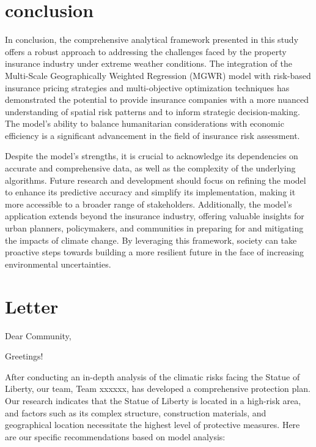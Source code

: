 \documentclass[12pt]{article}
\begin{document}
\section{conclusion}
 In conclusion, the comprehensive analytical framework presented in this study offers a robust approach to addressing the challenges faced by the property insurance industry under extreme weather conditions. The integration of the Multi-Scale Geographically Weighted Regression (MGWR) model with risk-based insurance pricing strategies and multi-objective optimization techniques has demonstrated the potential to provide insurance companies with a more nuanced understanding of spatial risk patterns and to inform strategic decision-making. The model's ability to balance humanitarian considerations with economic efficiency is a significant advancement in the field of insurance risk assessment.

Despite the model's strengths, it is crucial to acknowledge its dependencies on accurate and comprehensive data, as well as the complexity of the underlying algorithms. Future research and development should focus on refining the model to enhance its predictive accuracy and simplify its implementation, making it more accessible to a broader range of stakeholders. Additionally, the model's application extends beyond the insurance industry, offering valuable insights for urban planners, policymakers, and communities in preparing for and mitigating the impacts of climate change. By leveraging this framework, society can take proactive steps towards building a more resilient future in the face of increasing environmental uncertainties.

\clearpage
\section*{Letter}
	\begin{flushleft}
		Dear Community,
	\end{flushleft}
	


Greetings!

After conducting an in-depth analysis of the climatic risks facing the Statue of Liberty, our team, Team xxxxxx, has developed a comprehensive protection plan. Our research indicates that the Statue of Liberty is located in a high-risk area, and factors such as its complex structure, construction materials, and geographical location necessitate the highest level of protective measures. Here are our specific recommendations based on model analysis:
\end{document}
